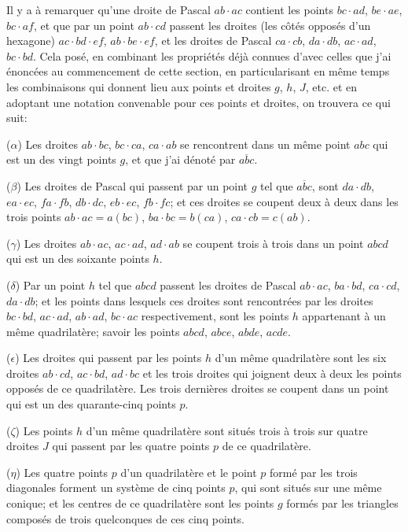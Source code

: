 \documentclass[12pt,a4paper]{article}
\theoremstyle{definition}
\begin{document}
Il y a \`{a} remarquer qu'une droite de Pascal $ab \cdot ac$ contient les points $bc \cdot ad$, $be \cdot ae$, $bc \cdot af$, et que par un point $ab \cdot cd$ passent les droites (les c\^{o}t\'{e}s oppos\'{e}s d'un hexagone) $ac \cdot bd \cdot ef$, $ab \cdot be \cdot ef$, et les droites de Pascal $ca \cdot cb$, $da \cdot db$, $ac \cdot ad$, $bc \cdot bd$. Cela pos\'{e}, en combinant les propri\'{e}t\'{e}s d\'{e}j\`{a} connues d'avec celles que j'ai \'{e}nonc\'{e}es au commencement de cette section, en particularisant en m\^{e}me temps les combinaisons qui donnent lieu aux points et droites $g$, $h$, $J$, etc. et en adoptant une notation convenable pour ces points et droites, on trouvera ce qui suit:

($\alpha$) Les droites $ab \cdot bc$, $bc \cdot ca$, $ca \cdot ab$ se rencontrent dans un m\^{e}me point $abc$ qui est un des vingt points $g$, et que j'ai d\'{e}not\'{e} par $\overline{abc}$.

($\beta$) Les droites de Pascal qui passent par un point $g$ tel que $\overline{abc}$, sont $da \cdot db$, $ea \cdot ec$, $fa \cdot fb$, $db \cdot dc$, $eb \cdot ec$, $fb \cdot fc$; et ces droites se coupent deux \`{a} deux dans les trois points $ab \cdot ac = a(bc)$, $ba \cdot bc = b(ca)$, $ca \cdot cb = c(ab)$.

($\gamma$) Les droites $ab \cdot ac$, $ac \cdot ad$, $ad \cdot ab$ se coupent trois \`{a} trois dans un point $abcd$ qui est un des soixante points $h$.

($\delta$) Par un point $h$ tel que $abcd$ passent les droites de Pascal $ab \cdot ac$, $ba \cdot bd$, $ca \cdot cd$, $da \cdot db$; et les points dans lesquels ces droites sont rencontr\'{e}es par les droites $bc \cdot bd$, $ac \cdot ad$, $ab \cdot ad$, $bc \cdot ac$ respectivement, sont les points $h$ appartenant \`{a} un m\^{e}me quadrilat\`{e}re; savoir les points $abcd$, $abce$, $abde$, $acde$.

($\epsilon$) Les droites qui passent par les points $h$ d'un m\^{e}me quadrilat\`{e}re sont les six droites $ab \cdot cd$, $ac \cdot bd$, $ad \cdot bc$ et les trois droites qui joignent deux \`{a} deux les points oppos\'{e}s de ce quadrilat\`{e}re. Les trois derni\`{e}res droites se coupent dans un point qui est un des quarante-cinq points $p$.

($\zeta$) Les points $h$ d'un m\^{e}me quadrilat\`{e}re sont situ\'{e}s trois \`{a} trois sur quatre droites $J$ qui passent par les quatre points $p$ de ce quadrilat\`{e}re.

($\eta$) Les quatre points $p$ d'un quadrilat\`{e}re et le point $p$ form\'{e} par les trois diagonales forment un syst\`{e}me de cinq points $p$, qui sont situ\'{e}s sur une m\^{e}me conique; et les centres de ce quadrilat\`{e}re sont les points $g$ form\'{e}s par les triangles compos\'{e}s de trois quelconques de ces cinq points.
\end{document}
